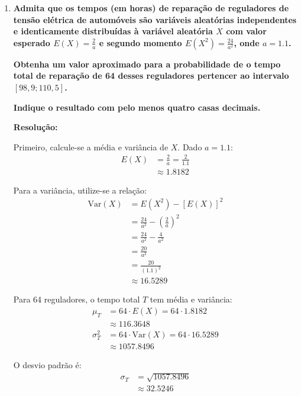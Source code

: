 \documentclass[a4paper,12pt]{article}
\begin{document}
\begin{enumerate}
  \item \textbf{Admita que os tempos (em horas) de reparação de reguladores de tensão elétrica de automóveis são variáveis aleatórias independentes e identicamente distribuídas à variável aleatória \( X \) com valor esperado \( E(X) = \frac{2}{a} \) e segundo momento \( E(X^2) = \frac{24}{a^2} \), onde \( a = 1.1 \).}
  
  \textbf{Obtenha um valor aproximado para a probabilidade de o tempo total de reparação de 64 desses reguladores pertencer ao intervalo \([98,9; 110,5]\).}
  
  \textbf{Indique o resultado com pelo menos quatro casas decimais.}

  \vspace{0.3cm}

  \begin{mdframed}[backgroundcolor=gray!10, linewidth=0pt, innertopmargin=10pt, innerbottommargin=10pt]
  \textbf{Resolução:}
  
  Primeiro, calcule-se a média e variância de \( X \). Dado \( a = 1.1 \):
  \begin{align*}
    E(X) &= \frac{2}{a} = \frac{2}{1.1} \\
    &\approx 1.8182
  \end{align*}
  
  Para a variância, utilize-se a relação:
  \begin{align*}
    \text{Var}(X) &= E(X^2) - [E(X)]^2 \\
    &= \frac{24}{a^2} - \left(\frac{2}{a}\right)^2 \\
    &= \frac{24}{a^2} - \frac{4}{a^2} \\
    &= \frac{20}{a^2} \\
    &= \frac{20}{(1.1)^2} \\
    &\approx 16.5289
  \end{align*}

  Para 64 reguladores, o tempo total \( T \) tem média e variância:
  \begin{align*}
    \mu_T &= 64 \cdot E(X) = 64 \cdot 1.8182 \\
    &\approx 116.3648 \\
    \sigma_T^2 &= 64 \cdot \text{Var}(X) = 64 \cdot 16.5289 \\
    &\approx 1057.8496
  \end{align*}
  
  O desvio padrão é:
  \begin{align*}
    \sigma_T &= \sqrt{1057.8496} \\
    &\approx 32.5246
  \end{align*}


\end{mdframed}
\end{enumerate}
\end{document}
